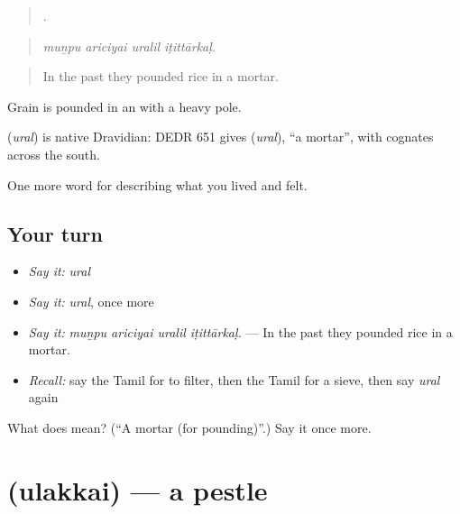 \begin{quote}
   .
\end{quote}

\begin{quote}
\emph{muṉpu ariciyai uralil iṭittārkaḷ.}
\end{quote}

\begin{quote}
In the past they pounded rice in a mortar.
\end{quote}

Grain is pounded in an  with a heavy pole.

\begin{cousinweb}
\textbf{} (\emph{ural}) is native Dravidian: DEDR 651 gives  (\emph{ural}), \textquotedblleft{}a mortar\textquotedblright{}, with cognates across the south.
\end{cousinweb}

\begin{grammarlens}[title={What you've built}]
One more word for describing what you lived and felt.
\end{grammarlens}

\subsection*{Your turn}
\begin{itemize}
\raggedright
  \item \emph{Say it:} \emph{ural}
  \item \emph{Say it:} \emph{ural}, once more
  \item \emph{Say it:} \emph{muṉpu ariciyai uralil iṭittārkaḷ.} — In the past they pounded rice in a mortar.
  \item \emph{Recall:} say the Tamil for to filter, then the Tamil for a sieve, then say \emph{ural} again
\end{itemize}

\begin{tcolorbox}[breakable,colback=teal!4,colframe=teal!35!black,title={Before you move on}]
What does  mean? (\textquotedblleft{}A mortar (for pounding)\textquotedblright{}.) Say it once more.
\end{tcolorbox}
\section[\texorpdfstring{\ta{உலக்கை} (ulakkai)}{உலக்கை (ulakkai)}]{ (ulakkai) — a pestle}

